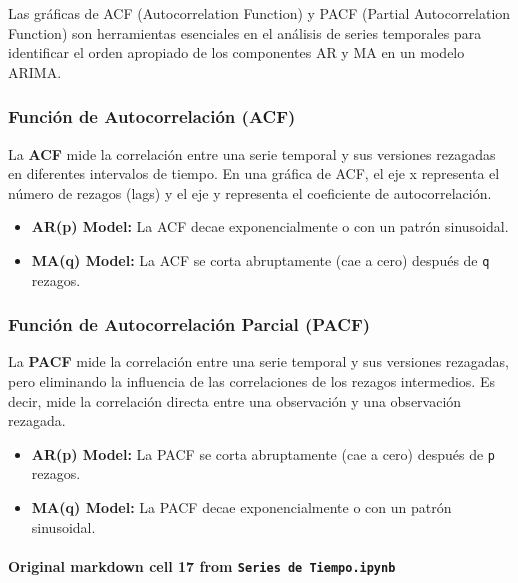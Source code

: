 \documentclass[
  11pt,
]{article}
\providecommand{\tightlist}{%
  \setlength{\itemsep}{0pt}\setlength{\parskip}{0pt}}
\begin{document}
Las gráficas de ACF (Autocorrelation Function) y PACF (Partial Autocorrelation Function) son herramientas esenciales en el análisis de series temporales para identificar el orden apropiado de los componentes AR y MA en un modelo ARIMA.

\subsubsection{Función de Autocorrelación (ACF)}\label{funciuxf3n-de-autocorrelaciuxf3n-acf}

La \textbf{ACF} mide la correlación entre una serie temporal y sus versiones rezagadas en diferentes intervalos de tiempo. En una gráfica de ACF, el eje x representa el número de rezagos (lags) y el eje y representa el coeficiente de autocorrelación.

\begin{itemize}
\tightlist
\item
  \textbf{AR(p) Model:} La ACF decae exponencialmente o con un patrón sinusoidal.
\item
  \textbf{MA(q) Model:} La ACF se corta abruptamente (cae a cero) después de \texttt{q} rezagos.
\end{itemize}

\subsubsection{Función de Autocorrelación Parcial (PACF)}\label{funciuxf3n-de-autocorrelaciuxf3n-parcial-pacf}

La \textbf{PACF} mide la correlación entre una serie temporal y sus versiones rezagadas, pero eliminando la influencia de las correlaciones de los rezagos intermedios. Es decir, mide la correlación directa entre una observación y una observación rezagada.

\begin{itemize}
\tightlist
\item
  \textbf{AR(p) Model:} La PACF se corta abruptamente (cae a cero) después de \texttt{p} rezagos.
\item
  \textbf{MA(q) Model:} La PACF decae exponencialmente o con un patrón sinusoidal.
\end{itemize}

\paragraph{\texorpdfstring{Original markdown cell 17 from \texttt{Series\ de\ Tiempo.ipynb}}{Original markdown cell 17 from Series de Tiempo.ipynb}}\label{original-markdown-cell-17-from-series-de-tiempoipynb}
\end{document}
